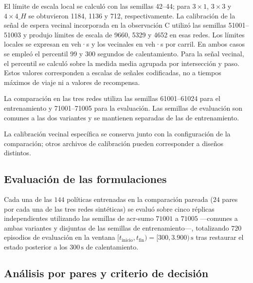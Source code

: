 El límite de escala local se calculó con las semillas 42--44; para $3\times1$, $3\times3$ y $4\times4\_H$ se obtuvieron 1184, 1136 y 712, respectivamente. La calibración de la señal de espera vecinal incorporada en la observación C utilizó las semillas 51001--51003 y produjo límites de escala de 9660, 5329 y 4652 en esas redes. Los límites locales se expresan en veh·s y los vecinales en veh·s por carril. En ambos casos se empleó el percentil 99 y 300 segundos de calentamiento. Para la señal vecinal, el percentil se calculó sobre la medida media agrupada por intersección y paso. Estos valores corresponden a escalas de señales codificadas, no a tiempos máximos de viaje ni a valores de recompensa.

La comparación en las tres redes utiliza las semillas 61001--61024 para el entrenamiento y 71001--71005 para la evaluación. Las semillas de evaluación son comunes a las dos variantes y se mantienen separadas de las de entrenamiento.

La calibración vecinal específica se conserva junto con la configuración de la comparación; otros archivos de calibración pueden corresponder a diseños distintos.

\subsection{Evaluación de las formulaciones}
\label{sec:evaluacion_variantes_mappo}

Cada una de las $144$ políticas entrenadas en la comparación pareada ($24$ pares por cada una de las tres redes sintéticas) se evaluó sobre cinco réplicas independientes utilizando las semillas de \acrshort{acr-sumo} $71001$ a $71005$ —comunes a ambas variantes y disjuntas de las semillas de entrenamiento—, totalizando $720$ episodios de evaluación en la ventana $[t_{\mathrm{inicio}},t_{\mathrm{fin}})=[300, 3.900)\,\text{s}$ tras restaurar el estado posterior a los $300\,\text{s}$ de calentamiento.

\subsection{Análisis por pares y criterio de decisión}
\label{sec:experimentos_evaluacion}
\label{subsec:detalle_analisis_pareado}

